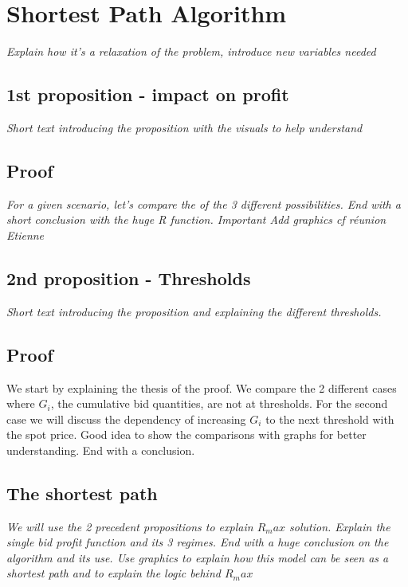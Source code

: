 \documentclass[letterpaper]{article}
\begin{document}
\section{Shortest Path Algorithm}
\textit{Explain how it's a relaxation of the problem, introduce new variables needed}
\subsection{1st proposition - impact on profit}
\textit{Short text introducing the proposition with the visuals to help understand }
\subsection{Proof}
\textit{For a given scenario, let's compare the of the 3 different possibilities. End with a short conclusion with the huge R function. Important Add graphics cf réunion Etienne}
\subsection{2nd proposition - Thresholds}
\textit{Short text introducing the proposition and explaining the different thresholds.}
\subsection{Proof}
We start by explaining the thesis of the proof. We compare the 2 different cases where $G_i$, the cumulative bid quantities, are not at thresholds.
For the second case we will discuss the dependency of increasing $G_i$ to the next threshold with the spot price. Good idea to show the comparisons with graphs for better understanding. End with a conclusion.

\subsection{The shortest path}
\textit{We will use the 2 precedent propositions to explain $R_max$ solution. Explain the single bid profit function and its 3 regimes. End with a huge conclusion on the algorithm and its use. Use graphics to explain how this model can be seen as a shortest path and to explain the logic behind $R_max$}
\end{document}
